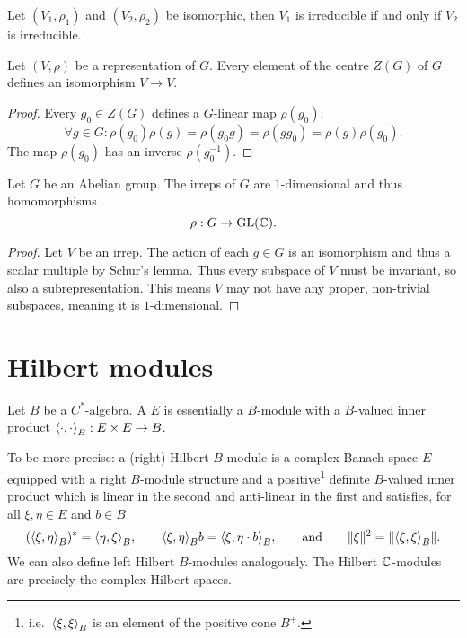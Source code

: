 \begin{proposition}
Let $(V_1,\rho_1)$ and $(V_2,\rho_2)$ be isomorphic, then $V_1$ is irreducible \textup{if and only if} $V_2$ is irreducible.
\end{proposition}

\begin{proposition}
Let $(V,\rho)$ be a representation of $G$. Every element of the centre $Z(G)$ of $G$ defines an isomorphism $V\to V$.
\end{proposition}
\begin{proof}
Every $g_0\in Z(G)$ defines a $G$-linear map $\rho(g_0)$:
\[ \forall g\in G: \rho(g_0)\rho(g) = \rho(g_0g) = \rho(gg_0) = \rho(g) \rho(g_0). \]
The map $\rho(g_0)$ has an inverse $\rho(g_0^{-1})$.
\end{proof}

\begin{proposition}
Let $G$ be an Abelian group. The irreps of $G$ are $1$-dimensional and thus homomorphisms
\[ \rho: G\to \operatorname{GL}(\mathbb{C}). \]
\end{proposition}
\begin{proof}
Let $V$ be an irrep. The action of each $g\in G$ is an isomorphism and thus a scalar multiple by Schur's lemma. Thus every subspace of $V$ must be invariant, so also a subrepresentation. This means $V$ may not have any proper, non-trivial subspaces, meaning it is $1$-dimensional.
\end{proof}

\section{Hilbert modules}
Let $B$ be a $C^*$-algebra. A  $E$ is essentially a $B$-module with a $B$-valued inner product $\inner{\cdot, \cdot}_B: E\times E \to B$.

To be more precise: a (right) Hilbert $B$-module is a complex Banach space $E$ equipped with a right $B$-module structure and a positive\footnote{i.e.\ $\inner{\xi, \xi}_B$ is an element of the positive cone $B^+$.} definite $B$-valued inner product which is linear in the second and anti-linear in the first and satisfies, for all $\xi,\eta \in E$ and $b\in B$
\[ (\inner{\xi,\eta}_B)^* = \inner{\eta,\xi}_B, \qquad \inner{\xi, \eta}_B b = \inner{\xi,\eta\cdot b}_B, \qquad \text{and} \qquad \norm{\xi}^2 = \norm{\inner{\xi,\xi}_B}. \]
We can also define left Hilbert $B$-modules analogously. The Hilbert $\mathbb{C}$-modules are precisely the complex Hilbert spaces.

